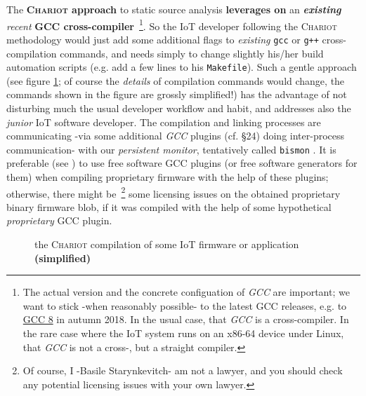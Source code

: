 The \textbf{\textsc{Chariot} approach} to static source analysis
\textbf{leverages on} an \textbf{\emph{existing}} \emph{recent}
\textbf{GCC cross-compiler}~\footnote{The actual version and
  the concrete configuation of \emph{GCC} are important; we want to stick -when
  reasonably possible- to the latest GCC releases, e.g. to
  \href{https://gcc.gnu.org/gcc-8/}{GCC 8} in autumn 2018. In the
  usual case, that \emph{GCC} is a cross-compiler. In the rare case
  where the IoT system runs on an x86-64 device under Linux, that
  \emph{GCC} is not a cross-, but a straight compiler.}. So the IoT
developer following the \textsc{Chariot} methodology would just add
some additional flags to \emph{existing} \texttt{gcc} or \texttt{g++}
cross-compilation commands, and needs simply to change slightly
his/her build automation scripts (e.g. add a few lines to his
\texttt{Makefile}). Such a gentle approach (see figure
\ref{fig:chariotcompil}; of course the \emph {details} of compilation
commands would change, the commands shown in the figure are grossly
simplified!) has the advantage of not disturbing much the usual
developer workflow and habit, and addresses also the \emph{junior} IoT
software developer. The compilation and linking processes are
communicating -via some additional \emph{GCC} plugins
(cf. \cite{gcc-internals} §24) doing inter-process communication- with
our  
\emph{persistent monitor}, tentatively called \texttt{bismon}
. It is preferable (see
\cite{gcc-runtime-library-exception}) to use free software GCC plugins
(or free software generators for them) when compiling proprietary
firmware with the help of these plugins; otherwise, there might
be~\footnote{Of course, I -Basile Starynkevitch- am not a lawyer, and
  you should check any potential licensing issues with your own
  lawyer.} some licensing issues on the obtained proprietary binary
firmware blob, if it was compiled with the help of some hypothetical
\emph{proprietary} GCC plugin.

\begin{figure}[h]
  \begin{center}
  \end{center}
  \caption{the \textsc{Chariot} compilation of some IoT firmware or
    application {\textbf{(simplified)}}}
  \label{fig:chariotcompil}
\end{figure}


